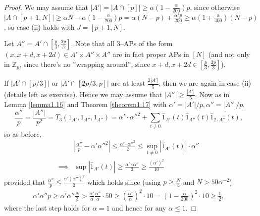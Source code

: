 \documentclass{article}
\theoremstyle{definition}
\begin{document}
\begin{proof}
    We may assume that $|A'| = |A \cap [p]| \ge \alpha \left(1-\frac{\alpha}{200}\right)p$, since otherwise $|A \cap [p+1, N]| \ge \alpha N - \alpha\left(1-\frac{\alpha}{200}\right)p = \alpha(N-p) + \frac{\alpha^2p}{200} \ge \alpha \left(1 + \frac{\alpha}{400}\right) (N-p)$, so case (ii) holds with $J = [p+1,N]$.
    \vspace{1mm}
     
    Let $A'' = A' \cap \left[\frac{p}{3},\frac{2p}{3}\right]$. Note that all 3--APs of the form $(x,x+d,x+2d) \in A' \times A'' \times A''$ are in fact proper APs  in $[N]$ (and not only in $\mathbb{Z}_p$, since there's no ''wrapping around'', since $x+d, x+2d \in \left[ \frac{p}{3}, \frac{2p}{3}\right]$). 
    \vspace{1mm}
     
    If $\left|A' \cap \left[p/3\right]\right|$ or $\left|A' \cap \left[2p/3, p \right]\right|$ are at least $\frac{2|A'|}{5}$, then we are again in case (ii) (details left as exercise). Hence we may assume that $|A''|\ge \frac{|A'|}{5}$. Now as in Lemma \ref{lemma1.16} and Theorem \ref{theorem1.17} with $\alpha' = |A'|/p, \alpha'' = |A''|/p$, \[
    \frac{\alpha''}{p} = \frac{|A''|}{p^2} = T_3(1_{A'},1_{A''},1_{A''}) = \alpha' \cdot \alpha''^2 + \sum_{t \neq 0}^{} \hat{1}_{A'}(t)\hat{1}_{A''}(t)\overline{\hat{1}_{2\cdot A''}(t)},
    \]
    so as before, 
    \begin{align*}
        &\left|\frac{\alpha''}{p}- \alpha' \alpha''^2 \right| \le \frac{\alpha' \cdot \alpha''^2}{2} \le \sup_{t \neq 0}|\hat{1}_{A'}(t)|\cdot \alpha'' \\
        \implies & \sup|\hat{1}_{A'}(t)|\ge \frac{\alpha' \cdot \alpha''}{2} \ge \frac{(\alpha')^2}{10}
    \end{align*}
    provided that $\frac{\alpha''}{p}\le \frac{\alpha'(\alpha'')^2}{2}$ which holds since (using $p\ge \frac{N}{3}$ and $N > 50\alpha^{-2}$)
    \begin{align*}
        \alpha' \alpha'' p \ge \alpha' \alpha'' \frac{N}{3} > \frac{\alpha'}{\alpha}\frac{\alpha''}{\alpha}\cdot  50 \ge \left(\frac{\alpha'}{\alpha}\right)^2\cdot  10 = \left(1-\frac{\alpha}{200}\right)^2 \cdot 10 \ge \frac{1}{2},
    \end{align*}
    where the last step holds for $\alpha=1$ and hence for any $\alpha\le 1$.
\end{proof}
\end{document}
